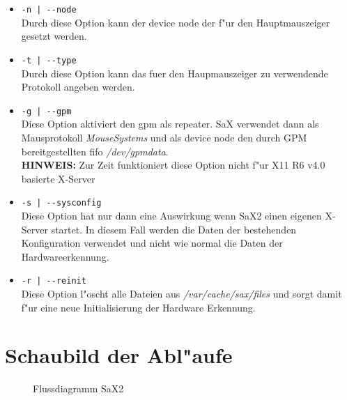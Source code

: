 \begin{itemize}
\item \verb+-n | --node+\\  
      Durch diese Option kann der device node der f"ur den 
      Hauptmauszeiger gesetzt werden.

\item \verb+-t | --type+\\
      Durch diese Option kann das fuer den Haupmauszeiger zu 
      verwendende Protokoll angeben werden.

\item \verb+-g | --gpm+\\
      Diese Option aktiviert den gpm als repeater. SaX verwendet 
      dann als Mausprotokoll \textit{MouseSystems} und als 
      device node den durch GPM bereitgestellten fifo 
      \textit{/dev/gpmdata}.\\
      \textbf{HINWEIS:} Zur Zeit funktioniert diese Option nicht 
      f"ur X11 R6 v4.0 basierte X-Server

\item \verb+-s | --sysconfig+\\
      Diese Option hat nur dann eine Auswirkung wenn SaX2 einen
      eigenen X-Server startet. In diesem Fall werden die Daten
      der bestehenden Konfiguration verwendet und nicht wie normal
      die Daten der Hardwareerkennung.

\item \verb+-r | --reinit+\\
      Diese Option l"oscht alle Dateien aus \textit{/var/cache/sax/files}
      und sorgt damit f"ur eine neue Initialisierung der Hardware
      Erkennung.

\end{itemize}

\newpage 
\section{Schaubild der Abl"aufe}

\begin{figure}[h]
\centering
{}
\caption{Flussdiagramm SaX2}
\end{figure}
